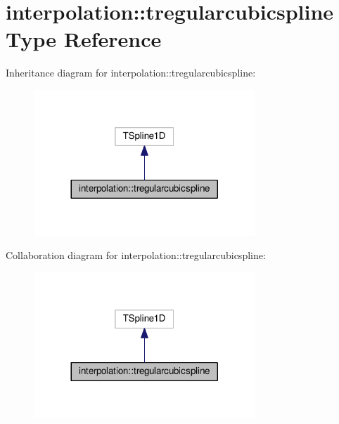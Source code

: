 \hypertarget{structinterpolation_1_1tregularcubicspline}{}\section{interpolation\+:\+:tregularcubicspline Type Reference}
\label{structinterpolation_1_1tregularcubicspline}


Inheritance diagram for interpolation\+:\+:tregularcubicspline\+:
\nopagebreak
\begin{figure}[H]
\begin{center}
\leavevmode
\includegraphics[width=236pt]{structinterpolation_1_1tregularcubicspline__inherit__graph}
\end{center}
\end{figure}


Collaboration diagram for interpolation\+:\+:tregularcubicspline\+:
\nopagebreak
\begin{figure}[H]
\begin{center}
\leavevmode
\includegraphics[width=236pt]{structinterpolation_1_1tregularcubicspline__coll__graph}
\end{center}
\end{figure}
